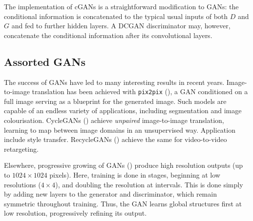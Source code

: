 The implementation of cGANs is a straightforward modification to GANs: the conditional information is concatenated to the typical usual inputs of both $D$ and $G$ and fed to further hidden layers. A DCGAN discriminator may, however, concatenate the conditional information after its convolutional layers.

\subsection{Assorted GANs}

The success of GANs have led to many interesting results in recent years. Image-to-image translation has been achieved with \texttt{pix2pix} (\cite{isola2017image}), a GAN conditioned on a full image serving as a blueprint for the generated image. Such models are capable of an endless variety of applications, including segmentation and image colourisation. CycleGANs (\cite{zhu2017unpaired}) achieve \emph{unpaired} image-to-image translation, learning to map between image domains in an unsupervised way. Application include style transfer. RecycleGANs (\cite{bansal2018recycle}) achieve the same for video-to-video retargeting.

Elsewhere, progressive growing of GANs (\cite{karras2017progressive}) produce high resolution outputs (up to $1024\times1024$ pixels). Here, training is done in stages, beginning at low resolutions ($4\times4$), and doubling the resolution at intervals. This is done simply by adding new layers to the generator and discriminator, which remain symmetric throughout training. Thus, the GAN learns global structures first at low resolution, progressively refining its output.

